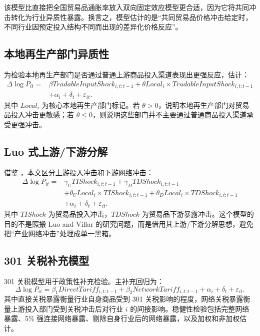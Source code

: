 \documentclass[12pt,a4paper,fontset=none]{ctexart}
\begin{document}
该模型比直接把全国贸易品通胀率放入双向固定效应模型更合适，因为它将共同冲击转化为行业异质性暴露。换言之，模型估计的是“共同贸易品价格冲击给定时，不同行业因预定投入结构不同而出现的差异化价格反应”。

\subsection{本地再生产部门异质性}

为检验本地再生产部门是否通过普通上游商品投入渠道表现出更强反应，估计：
\begin{equation}
\begin{aligned}
\Delta \log P_{it}={}&
\beta TradableInputShock_{i,t:t-1}
+\theta Local_i\times TradableInputShock_{i,t:t-1}\\
&+\alpha_i+\delta_t+\varepsilon_{it}.
\end{aligned}
\end{equation}
其中 \(Local_i\) 为核心本地再生产部门标记。若 \(\theta>0\)，说明本地再生产部门对贸易品投入冲击更敏感；若 \(\theta\leq 0\)，则说明这些部门并不主要通过普通商品投入渠道承受更强冲击。

\subsection{Luo 式上游/下游分解}

借鉴 \citet{luo2023propagation}，本文区分上游投入冲击和下游网络冲击：
\begin{equation}
\begin{aligned}
\Delta \log P_{it}={}&
\gamma_U TIShock_{i,t:t-1}
+\gamma_D TDShock_{i,t:t-1}\\
&+\theta_U Local_i\times TIShock_{i,t:t-1}
+\theta_D Local_i\times TDShock_{i,t:t-1}\\
&+\alpha_i+\delta_t+\varepsilon_{it}.
\end{aligned}
\end{equation}
其中 \(TIShock\) 为贸易品投入冲击，\(TDShock\) 为贸易品下游暴露冲击。这个模型的目的不是照搬 Luo and Villar 的研究问题，而是借用其上游/下游分解思想，避免把“产业网络冲击”处理成单一黑箱。

\subsection{301 关税补充模型}

301 关税模型用于政策性补充检验。主补充回归为：
\begin{equation}
\Delta \log P_{it}
=\beta_1 DirectTariff_{i,t:t-1}
+\beta_2 NetworkTariff_{i,t:t-1}
+\alpha_i+\delta_t+\varepsilon_{it}.
\end{equation}
其中直接关税暴露衡量行业自身商品受到 301 关税影响的程度，网络关税暴露衡量上游投入部门受到关税冲击后对行业 \(i\) 的间接影响。稳健性检验包括完整网络暴露、5\% 强连接网络暴露、剔除自身行业后的网络暴露，以及加权和非加权估计。
\end{document}
